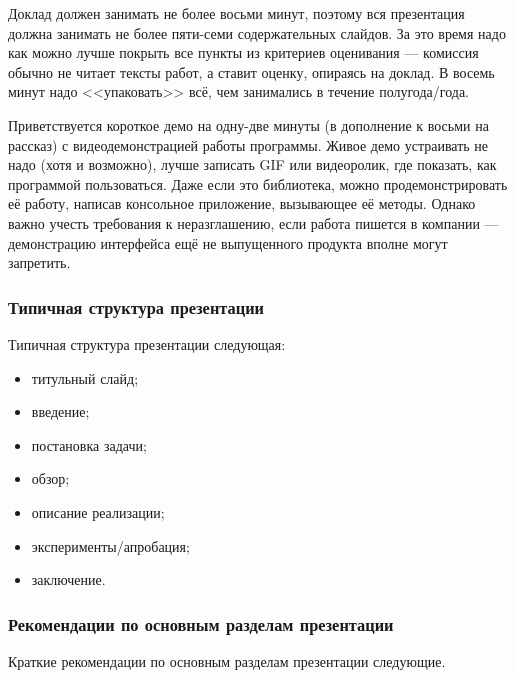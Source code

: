 \documentclass{article}
\begin{document}
Доклад должен занимать не более восьми минут, поэтому вся презентация должна занимать не более пяти-семи содержательных слайдов. За это время надо как можно лучше покрыть все пункты из критериев оценивания --- комиссия обычно не читает тексты работ, а ставит оценку, опираясь на доклад. В восемь минут надо <<упаковать>> всё, чем занимались в течение полугода/года.

Приветствуется короткое демо на одну-две минуты (в дополнение к восьми на рассказ) с видеодемонстрацией работы программы. Живое демо устраивать не надо (хотя и возможно), лучше записать GIF или видеоролик, где показать, как программой пользоваться. Даже если это библиотека, можно продемонстрировать её работу, написав консольное приложение, вызывающее её методы. Однако важно учесть требования к неразглашению, если работа пишется в компании --- демонстрацию интерфейса ещё не выпущенного продукта вполне могут запретить.

\subsubsection{Типичная структура презентации}

Типичная структура презентации следующая:

\begin{itemize}
    \item титульный слайд;
    \item введение;
    \item постановка задачи;
    \item обзор;
    \item описание реализации;
    \item эксперименты/апробация;
    \item заключение.
\end{itemize}

\subsubsection{Рекомендации по основным разделам презентации}

Краткие рекомендации по основным разделам презентации следующие.
\end{document}
